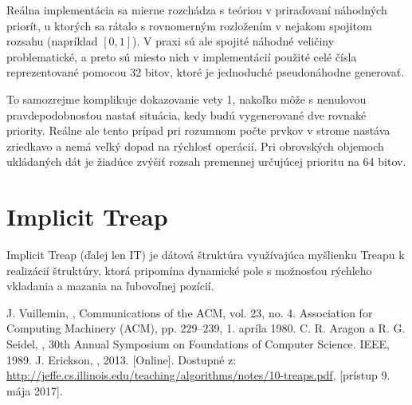 \documentclass[a4paper, 12pt]{article}
\theoremstyle{definition}
\begin{document}
Reálna implementácia sa mierne rozchádza s teóriou v priraďovaní
náhodných priorít, u ktorých sa rátalo s rovnomerným rozložením v nejakom
spojitom rozsahu (napríklad $[0, 1]$). V praxi sú ale spojité náhodné veličiny
problematické, a preto sú miesto nich v implementácií použité celé čísla
reprezentované pomocou 32 bitov, ktoré je jednoduché pseudonáhodne generovať.

To samozrejme komplikuje dokazovanie vety 1, nakoľko môže s nenulovou
pravdepodobnosťou nastať situácia, kedy budú vygenerované dve rovnaké priority.
Reálne ale tento prípad pri rozumnom počte prvkov v strome nastáva zriedkavo a
nemá veľký dopad na rýchlosť operácií. Pri obrovských objemoch ukládaných
dát je žiadúce zvýšiť rozsah premennej určujúcej prioritu na 64 bitov.

\section{Implicit Treap}

Implicit Treap (ďalej len IT) je dátová štruktúra využívajúca myšlienku
Treapu k realizácií štruktúry, ktorá pripomína dynamické pole s možnosťou
rýchleho vkladania a mazania na ľubovoľnej pozícií. 

\begin{thebibliography}{9}
    J. Vuillemin, , Communications of
        the ACM, vol. 23, no. 4. Association for Computing Machinery (ACM), pp.
        229–239, 1. apríla 1980.
    C. R. Aragon a R. G. Seidel, , 30th Annual
        Symposium on Foundations of Computer Science. IEEE, 1989.
    J. Erickson, , 2013. [Online]. Dostupné
        z:
        \url{http://jeffe.cs.illinois.edu/teaching/algorithms/notes/10-treaps.pdf}.
        [prístup 9. mája 2017].
\end{thebibliography}
\end{document}
